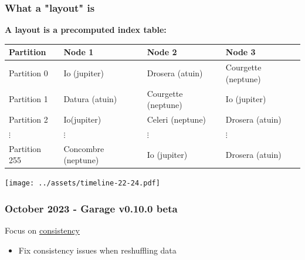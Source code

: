 \documentclass[aspectratio=169]{beamer}
\begin{document}
\begin{frame}
	\frametitle{What a "layout" is}
		\textbf{A layout is a precomputed index table:}
		\vspace{1em}

		{\footnotesize
			\begin{center}
			\begin{tabular}{|l|l|l|l|}
				\hline
				\textbf{Partition} & \textbf{Node 1} & \textbf{Node 2} & \textbf{Node 3} \\
				\hline
				\hline
				Partition 0 & Io (jupiter) & Drosera (atuin) & Courgette (neptune) \\
				\hline
				Partition 1 & Datura (atuin) & Courgette (neptune) & Io (jupiter) \\
				\hline
				Partition 2 & Io(jupiter) & Celeri (neptune) & Drosera (atuin) \\
				\hline
				\hspace{1em}$\vdots$ & \hspace{1em}$\vdots$ & \hspace{1em}$\vdots$ & \hspace{1em}$\vdots$ \\
				\hline
				Partition 255 & Concombre (neptune) & Io (jupiter) & Drosera (atuin) \\
				\hline
			\end{tabular}
			\end{center}
		}

	\vspace{2em}

	\vspace{1em}
\end{frame}




\begin{frame}
	\begin{center}
		\texttt{[image: ../assets/timeline-22-24.pdf]}
	\end{center}
\end{frame}

\begin{frame}
	\frametitle{October 2023 - Garage v0.10.0 beta}
	Focus on \underline{consistency}
	\vspace{2em}
	\begin{itemize}
		\item Fix consistency issues when reshuffling data
	\end{itemize}
\end{frame}
\end{document}
